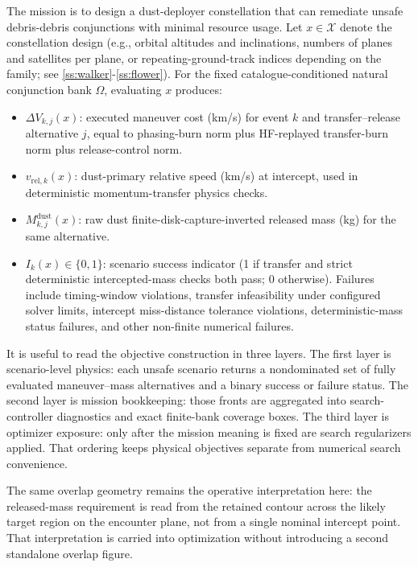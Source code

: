     The mission is to design a dust-deployer constellation that can remediate unsafe debris-debris conjunctions with minimal resource usage. Let $x\in\mathcal{X}$ denote the constellation design (e.g., orbital altitudes and inclinations, numbers of planes and satellites per plane, or repeating-ground-track indices depending on the family; see \cref{ss:walker}-\cref{ss:flower}). For the fixed catalogue-conditioned natural conjunction bank \(\Omega\), evaluating $x$ produces:
    \begin{itemize}[leftmargin=*]
        \item $\Delta V_{k,j}(x)$: executed maneuver cost (km/s) for event $k$ and transfer--release alternative $j$, equal to phasing-burn norm plus HF-replayed transfer-burn norm plus release-control norm.
        \item $v_{\mathrm{rel},k}(x)$: dust-primary relative speed (km/s) at intercept, used in deterministic momentum-transfer physics checks.
        \item $M^{\mathrm{dust}}_{k,j}(x)$: raw dust finite-disk-capture-inverted released mass (kg) for the same alternative.
        \item $I_k(x)\in\{0,1\}$: scenario success indicator (1 if transfer and strict deterministic intercepted-mass checks both pass; 0 otherwise). Failures include timing-window violations, transfer infeasibility under configured solver limits, intercept miss-distance tolerance violations, deterministic-mass status failures, and other non-finite numerical failures.
    \end{itemize}

    It is useful to read the objective construction in three layers. The first layer is scenario-level physics: each unsafe scenario returns a nondominated set of fully evaluated maneuver--mass alternatives and a binary success or failure status. The second layer is mission bookkeeping: those fronts are aggregated into search-controller diagnostics and exact finite-bank coverage boxes. The third layer is optimizer exposure: only after the mission meaning is fixed are search regularizers applied. That ordering keeps physical objectives separate from numerical search convenience.

    The same overlap geometry remains the operative interpretation here: the released-mass requirement is read from the retained contour across the likely target region on the encounter plane, not from a single nominal intercept point. That interpretation is carried into optimization without introducing a second standalone overlap figure.

